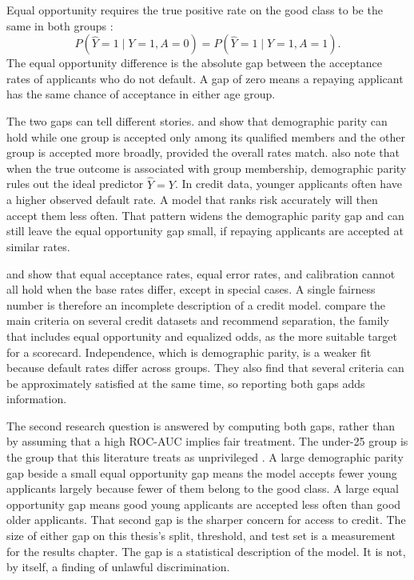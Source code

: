 Equal opportunity requires the true positive rate on the good class to be the same in both groups \citep{hardt2016equality}:
\begin{equation}
  P(\hat{Y} = 1 \mid Y = 1, A = 0) = P(\hat{Y} = 1 \mid Y = 1, A = 1).
  \label{eq:equal-opportunity}
\end{equation}
The equal opportunity difference is the absolute gap between the acceptance rates of applicants who do not default. A gap of zero means a repaying applicant has the same chance of acceptance in either age group.

The two gaps can tell different stories. \citet{dwork2012awareness} and \citet{hardt2016equality} show that demographic parity can hold while one group is accepted only among its qualified members and the other group is accepted more broadly, provided the overall rates match. \citet{hardt2016equality} also note that when the true outcome is associated with group membership, demographic parity rules out the ideal predictor \(\hat{Y} = Y\). In credit data, younger applicants often have a higher observed default rate. A model that ranks risk accurately will then accept them less often. That pattern widens the demographic parity gap and can still leave the equal opportunity gap small, if repaying applicants are accepted at similar rates.

\citet{chouldechova2017disparate} and \citet{kleinberg2017tradeoffs} show that equal acceptance rates, equal error rates, and calibration cannot all hold when the base rates differ, except in special cases. A single fairness number is therefore an incomplete description of a credit model. \citet{kozodoi2022fairness} compare the main criteria on several credit datasets and recommend separation, the family that includes equal opportunity and equalized odds, as the more suitable target for a scorecard. Independence, which is demographic parity, is a weaker fit because default rates differ across groups. They also find that several criteria can be approximately satisfied at the same time, so reporting both gaps adds information.

The second research question is answered by computing both gaps, rather than by assuming that a high ROC-AUC implies fair treatment. The under-25 group is the group that this literature treats as unprivileged \citep{kamiran2012reweighing, bellamy2019aif360}. A large demographic parity gap beside a small equal opportunity gap means the model accepts fewer young applicants largely because fewer of them belong to the good class. A large equal opportunity gap means good young applicants are accepted less often than good older applicants. That second gap is the sharper concern for access to credit. The size of either gap on this thesis's split, threshold, and test set is a measurement for the results chapter. The gap is a statistical description of the model. It is not, by itself, a finding of unlawful discrimination.

